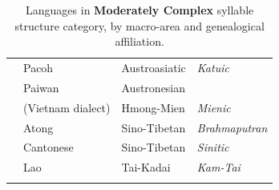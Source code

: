 \begin{table}
\begin{tabularx}{\textwidth}{lQQQ}
& {Pacoh} & Austroasiatic & \textit{Katuic}\\
& {Paiwan} & Austronesian & \\
&  (Vietnam dialect) & Hmong-Mien & \textit{Mienic}\\
& {Atong} & Sino-Tibetan & \textit{Brahmaputran}\\
& {Cantonese} & Sino-Tibetan & \textit{Sinitic}\\
& {Lao} & Tai-Kadai & \textit{Kam-Tai}\\
\lspbottomrule
\end{tabularx}
\caption{\label{tab:2.5.}Languages in \textbf{Moderately Complex} syllable structure category, by macro-area and genealogical affiliation.}
\end{table}




